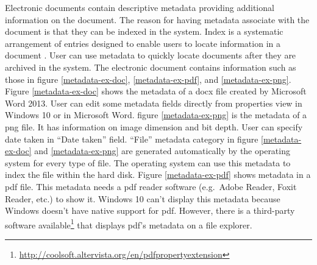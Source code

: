 Electronic documents contain descriptive metadata providing additional information on the document.
The reason for having metadata associate with the document is that they can be indexed in the system.
Index is a systematic arrangement of entries designed to enable users to locate information in a document \cite{def-index}.
User can use metadata to quickly locate documents after they are archived in the system.
The electronic document contains information such as those in figure \ref{metadata-ex-doc}, \ref{metadata-ex-pdf}, and \ref{metadata-ex-png}.
Figure \ref{metadata-ex-doc} shows the metadata of a docx file created by Microsoft Word 2013.
User can edit some metadata fields directly from properties view in Windows 10 or in Microsoft Word.
figure \ref{metadata-ex-png} is the metadata of a \gls{png} file.
It has information on image dimension and bit depth.
User can specify date taken in \enquote{Date taken} field.
\enquote{File} metadata category in figure \ref{metadata-ex-doc} and \ref{metadata-ex-png} are generated automatically by the operating system for every type of file.
The operating system can use this metadata to index the file within the hard disk.
Figure \ref{metadata-ex-pdf} shows metadata in a \gls{pdf} file.
This metadata needs a \gls{pdf} reader software (e.g.\ Adobe Reader, Foxit Reader, etc.) to show it.
Windows 10 can't display this metadata because Windows doesn't have native support for \gls{pdf}.
However, there is a third-party software available\footnote{\url{http://coolsoft.altervista.org/en/pdfpropertyextension}} that displays \gls{pdf}'s metadata on a file explorer.
